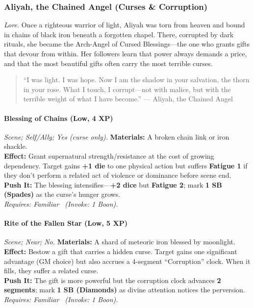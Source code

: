 \subsubsection{Aliyah, the Chained Angel (Curses \& Corruption)}
\textit{Lore.} Once a righteous warrior of light, Aliyah was torn from heaven and bound in chains of black iron beneath a forgotten chapel. There, corrupted by dark rituals, she became the Arch-Angel of Cursed Blessings—the one who grants gifts that devour from within. Her followers learn that power always demands a price, and that the most beautiful gifts often carry the most terrible curses.

\begin{quote}
``I was light. I was hope. Now I am the shadow in your salvation, the thorn in your rose. What I touch, I corrupt—not with malice, but with the terrible weight of what I have become.'' — Aliyah, the Chained Angel
\end{quote}

\paragraph{Blessing of Chains (Low, 4 XP)} \emph{Scene; Self/Ally; Yes (curse only).}
\textbf{Materials:} A broken chain link or iron shackle.\\
\textbf{Effect:} Grant supernatural strength/resistance at the cost of growing dependency. Target gains \textbf{+1 die} to one physical action but suffers \textbf{Fatigue 1} if they don't perform a related act of violence or dominance before scene end.\\
\textbf{Push It:} The blessing intensifies—\textbf{+2 dice} but \textbf{Fatigue 2}; mark \textbf{1 SB (Spades)} as the curse's hunger grows.\\
\emph{Requires: Familiar \ (\textit{Invoke:} 1 Boon).}

\paragraph{Rite of the Fallen Star (Low, 5 XP)} \emph{Scene; Near; No.}
\textbf{Materials:} A shard of meteoric iron blessed by moonlight.\\
\textbf{Effect:} Bestow a gift that carries a hidden curse. Target gains one significant advantage (GM choice) but also accrues a 4-segment ``Corruption'' clock. When it fills, they suffer a related curse.\\
\textbf{Push It:} The gift is more powerful but the corruption clock advances \textbf{2 segments}; mark \textbf{1 SB (Diamonds)} as divine attention notices the perversion.\\
\emph{Requires: Familiar \ (\textit{Invoke:} 1 Boon).}

